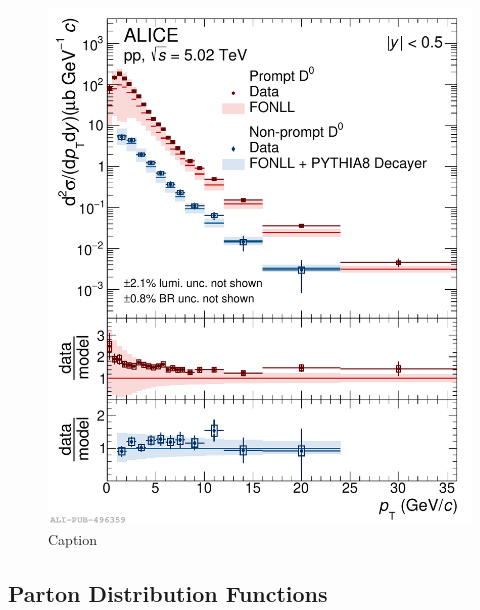 \begin{figure}
    \centering
    \includegraphics[width=0.48\linewidth]{Figures/Chapter 2/CrossSectionD0_Prompt_NonPrompt_pp5TeV_vsFONLL_Pythia8_BRnative_1.pdf}
    \caption{Caption}
    \label{fig:ppDmeson}
\end{figure}

\subsection{Parton Distribution Functions}


